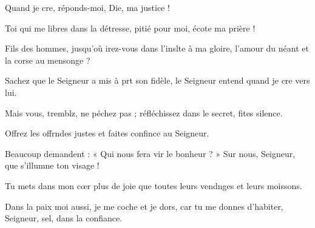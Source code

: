\item Quand je cre, réponds-moi,\psstar{} Die, ma justice !
\item Toi qui me libres dans la détresse,\psstar{} pitié pour moi, écote ma prière !
\item Fils des hommes, jusqu’où irez-vous dans l’inslte à ma gloire,\psstar{} l’amour du néant et la corse au mensonge ?
\item Sachez que le Seigneur a mis à prt son fidèle,\psstar{} le Seigneur entend quand je cre vers lui.
\item Mais vous, tremblz, ne péchez pas ;\psstar{} réfléchissez dans le secret, fites silence.
\item Offrez les offrndes justes\psstar{} et faites confince au Seigneur.
\item Beaucoup demandent : « Qui nous fera vir le bonheur ? »\psstar{} Sur nous, Seigneur, que s’illumne ton visage !
\item Tu mets dans mon cœr plus de joie\psstar{} que toutes leurs vendnges et leurs moissons.
\item Dans la paix moi aussi, je me coche et je dors,\psstar{} car tu me donnes d’habiter, Seigneur, sel, dans la confiance.